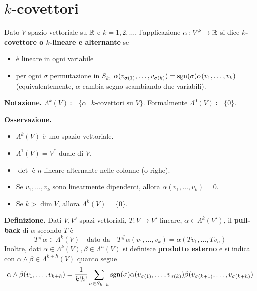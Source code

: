 \section{$k$-covettori}

Dato $V$ spazio vettoriale su $\mathbb R$ e $k=1,2,\ldots$, l'applicazione $\alpha \colon  V^k \to \mathbb R$ si dice \textbf{$k$-covettore o $k$-lineare e alternante} se
\begin{itemize}

	\item è lineare in ogni variabile

	\item per ogni $\sigma$ permutazione in $S_k$, $\alpha(v_{\sigma(1)},\ldots,v_{\sigma(k)}) = \operatorname{sgn}(\sigma) \alpha(v_1,\ldots,v_k)$ (equivalentemente, $\alpha$ cambia segno scambiando due variabili).

\end{itemize}

\textbf{Notazione.} $\Lambda^k (V) \coloneqq  \{\alpha \text{ $k$-covettori su } V \}$. Formalmente $\Lambda^0(V) \coloneqq \{0\}$.

\textbf{Osservazione.} 
\begin{itemize}

	\item $\Lambda^k(V)$ è uno spazio vettoriale. 

	\item $\Lambda^1(V) = V^*$ duale di $V$.

	\item $\det$ è $n$-lineare alternante nelle colonne (o righe).

	\item Se $v_1,\ldots,v_k$ sono linearmente dipendenti, allora $\alpha(v_1,\ldots,v_k) = 0$.

	\item Se $k > \dim V$, allora $\Lambda^k(V) = \{0\}$.

\end{itemize}

\textbf{Definizione.} Dati $V,V'$ spazi vettoriali, $T \colon V \to V'$ lineare, $\alpha \in \Lambda^k (V')$, il \textbf{pull-back} di $\alpha$ secondo $T$ è
%
$$
T^\# \alpha \in \Lambda^k(V) \quad \text{dato da} \quad T^\# \alpha(v_1,\ldots,v_k) = \alpha(Tv_1,\ldots,Tv_n)
$$
%
Inoltre, dati $\alpha \in \Lambda^k(V), \beta \in \Lambda^h(V)$ si definisce \textbf{prodotto esterno} e si indica con $\alpha \wedge \beta \in \Lambda^{k+h}(V)$ quanto segue
%
$$
	\alpha \wedge \beta (v_1,\ldots,v_{k+h}) = \frac{1}{k!h!} \sum_{\sigma \in S_{k+h}} \operatorname{sgn} (\sigma) \alpha(v_{\sigma(1)},\ldots,v_{\sigma(k)}) \beta(v_{\sigma(k+1)},\ldots,v_{\sigma(k+h)})
$$
%
